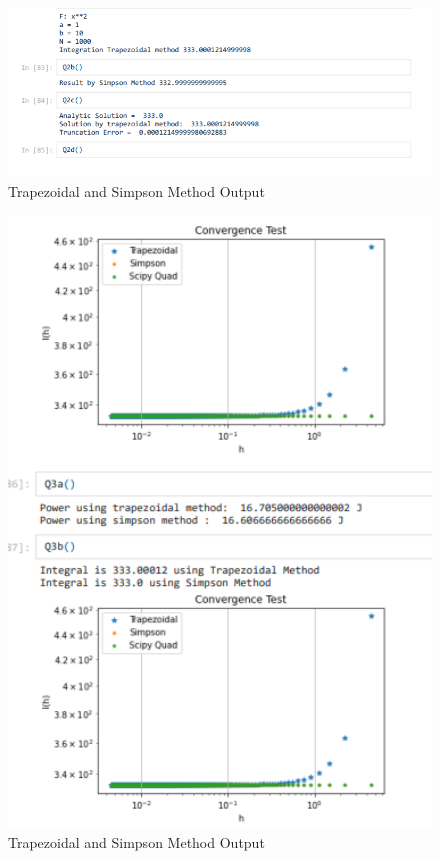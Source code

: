 \documentclass{article}
\begin{document}
\newpage
\begin{figure}[h]
    \centering
    \includegraphics[width=15cm,height=5cm \textwidth]{Trapezoidal_and_simpson/2.PNG}
\caption{Trapezoidal and Simpson Method Output}
\end{figure}
\begin{figure}[h]
    \centering
    \includegraphics[width=15cm,height=12cm \textwidth]{Trapezoidal_and_simpson/Capture.PNG}
\caption{Trapezoidal and Simpson Method Output}
\end{figure}
\end{document}
